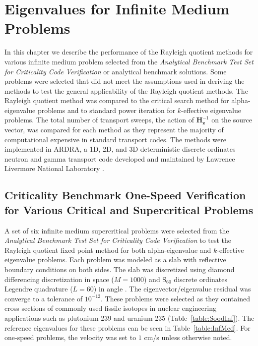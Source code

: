 \chapter{Eigenvalues for Infinite Medium Problems}%

In this chapter we describe the performance of the Rayleigh quotient methods for various infinite medium problem selected from the \textit{Analytical Benchmark Test Set for Criticality Code Verification} \cite{sood2003analytical} or analytical benchmark solutions. Some problems were selected that did not meet the assumptions used in deriving the methods to test the general applicability of the Rayleigh quotient methods. The Rayleigh quotient method was compared to the critical search method \cite{hill_efficient_1983} for alpha-eigenvalue problems and to standard power iteration for $k$-effective eigenvalue problems. The total number of transport sweeps, the action of $\mathbf{H}_{\mathbf{z}}^{-1}$ on the source vector, was compared for each method as they represent the majority of computational expensive in standard transport codes. The methods were implemented in ARDRA, a 1D, 2D, and 3D deterministic discrete ordinates neutron and gamma transport code developed and maintained by Lawrence Livermore National Laboratory \cite{hanebutte_ardra_1999}.

\section{Criticality Benchmark One-Speed Verification for Various Critical and Supercritical Problems}

A set of six infinite medium supercritical problems were selected from the \textit{Analytical Benchmark Test Set for Criticality Code Verification} \cite{sood2003analytical} to test the Rayleigh quotient fixed point method for both alpha-eigenvalue and $k$-effective eigenvalue problems. Each problem was modeled as a slab with reflective boundary conditions on both sides. The slab was discretized using diamond differencing discretization in space ($M = 1000$) and S$_{60}$ discrete ordinates Legendre quadrature ($L = 60$) in angle \cite{lewis_computational_1984}. The eigenvector/eigenvalue residual was converge to a tolerance of $10^{-12}$. These problems were selected as they contained cross sections of commonly used fissile isotopes in nuclear engineering applications such as plutonium-239 and uranium-235 (Table~\ref{table:SoodInf}). The reference eigenvalues for these problems can be seen in Table~\ref{table:InfMed}. For one-speed problems, the velocity was set to $1$ cm/s unless otherwise noted.

